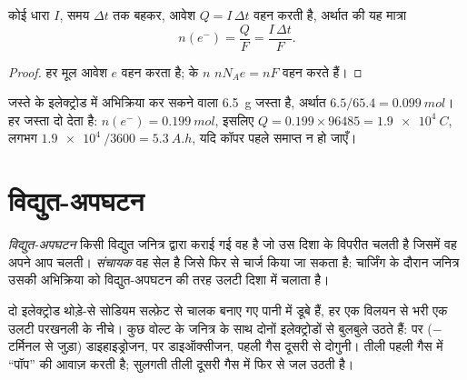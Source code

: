 \begin{proposition}[आवेश और इलेक्ट्रॉनों की मात्रा]\label{prop:g12:cells-and-electrolysis:charge}
कोई धारा $I$, समय $\Delta t$ तक बहकर, आवेश
$Q = I\,\Delta t$ वहन करती है, अर्थात  की यह मात्रा
\[
  n(e^-) = \frac{Q}{F} = \frac{I\,\Delta t}{F} .
\]
\end{proposition}

\begin{proof}
हर  मूल आवेश $e$ वहन करता है;  के $n$ 
$n N_A e = n F$ वहन करते हैं।
\end{proof}

\begin{example}[डैनियल सेल की धारिता]\label{ex:g12:cells-and-electrolysis:capacity}
जस्ते के इलेक्ट्रोड में अभिक्रिया कर सकने वाला \qty{6.5}{g} जस्ता है, अर्थात
$6.5/65.4 = \qty{0.099}{mol}$। हर जस्ता  दो  देता है:
$n(e^-) = \qty{0.199}{mol}$, इसलिए $Q = 0.199 \times 96485 = \qty{1.9e4}{C}$,
लगभग $\qty{1.9e4}{}/3600 = \qty{5.3}{A.h}$, यदि कॉपर  पहले
समाप्त न हो जाएँ।
\end{example}

\section{विद्युत-अपघटन}

\begin{definition}[विद्युत-अपघटन, संचायक]\label{def:g12:cells-and-electrolysis:electrolysis}
\emph{विद्युत-अपघटन} किसी विद्युत जनित्र द्वारा
कराई गई वह  है जो उस दिशा के विपरीत चलती है जिसमें वह
अपने आप चलती। \emph{संचायक} वह सेल है जिसे
फिर से चार्ज किया जा सकता है: चार्जिंग के दौरान जनित्र उसकी अभिक्रिया को
विद्युत-अपघटन की तरह उलटी दिशा में चलाता है।
\end{definition}

\begin{inthelab}[पानी का विद्युत-अपघटन]
दो इलेक्ट्रोड थोड़े-से सोडियम सल्फ़ेट से चालक बनाए गए पानी में डूबे हैं, हर एक
विलयन से भरी एक उलटी परखनली के नीचे। कुछ वोल्ट के
जनित्र के साथ दोनों इलेक्ट्रोडों से बुलबुले उठते हैं:
 पर ($-$ टर्मिनल से जुड़ा) डाइहाइड्रोजन,  पर
डाइऑक्सीजन, पहली गैस दूसरी से दोगुनी।  तीली
पहली गैस में ``पॉप'' की आवाज़ करती है; सुलगती तीली दूसरी गैस में फिर से जल उठती है।
\end{inthelab}

